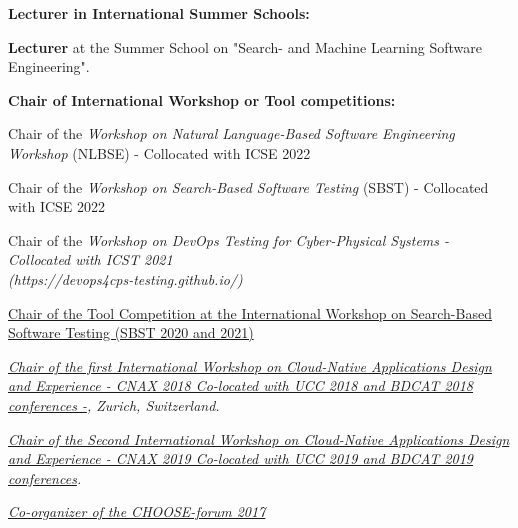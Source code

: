 \documentclass[10pt]{article}
\begin{document}
\textbf{Lecturer in International Summer Schools:}
\begin{innerlist}
\item \textbf{Lecturer} at the Summer School on "Search- and Machine Learning Software Engineering". 
\end{innerlist}




\textbf{Chair of International Workshop or Tool competitions:}
\begin{innerlist}
\item Chair of the \textit{Workshop on Natural Language-Based Software Engineering Workshop} (NLBSE) - Collocated with ICSE 2022
\item Chair of  the \textit{Workshop on Search-Based Software Testing} (SBST) - Collocated with ICSE 2022
\item Chair of the \textit{Workshop on DevOps Testing for Cyber-Physical Systems - Collocated with ICST 2021 \\(https://devops4cps-testing.github.io/)} 
\item \href{}
{Chair of the Tool Competition at the 
International Workshop on Search-Based Software Testing (SBST 2020 and 2021)} 
       \item \emph{\href{http://cnax.servicelaboratory.ch/}
                   {\textit{Chair of the first International Workshop on Cloud-Native Applications Design and Experience - CNAX 2018
Co-located with UCC 2018 and BDCAT 2018 conferences -}}, Zurich, Switzerland.}

       \item \emph{\href{}
                   {\textit{Chair of the Second International Workshop on Cloud-Native Applications Design and Experience - CNAX 2019
Co-located with UCC 2019 and BDCAT 2019 conferences}}.}
\item \textit{\href{http://www.choose.s-i.ch/events/forum2017/index.html}{Co-organizer of the CHOOSE-forum 2017}} 
\end{innerlist}
\end{document}
